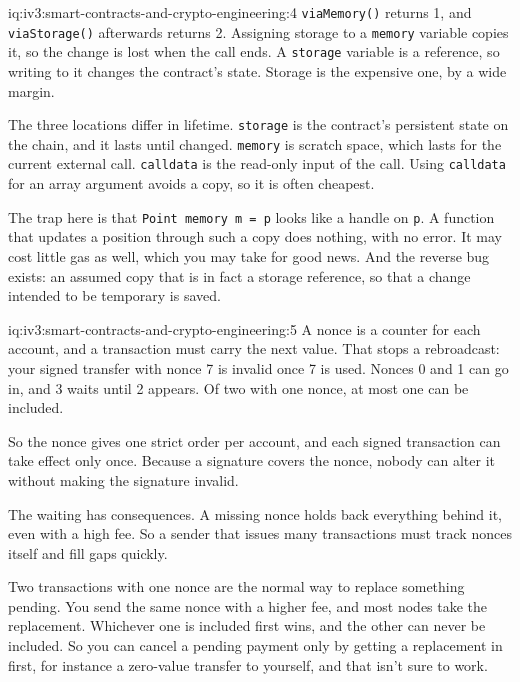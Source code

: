 \begin{solution}{iq:iv3:smart-contracts-and-crypto-engineering:4}
\texttt{viaMemory()} returns 1, and \texttt{viaStorage()} afterwards returns 2. Assigning storage to a \texttt{memory} variable copies it, so the change is lost when the call ends. A \texttt{storage} variable is a reference, so writing to it changes the contract's state. Storage is the expensive one, by a wide margin.

The three locations differ in lifetime. \texttt{storage} is the contract's persistent state on the chain, and it lasts until changed. \texttt{memory} is scratch space, which lasts for the current external call. \texttt{calldata} is the read-only input of the call. Using \texttt{calldata} for an array argument avoids a copy, so it is often cheapest.

The trap here is that \texttt{Point memory m = p} looks like a handle on \texttt{p}. A function that updates a position through such a copy does nothing, with no error. It may cost little gas as well, which you may take for good news. And the reverse bug exists: an assumed copy that is in fact a storage reference, so that a change intended to be temporary is saved.

\end{solution}

\begin{solution}{iq:iv3:smart-contracts-and-crypto-engineering:5}
A nonce is a counter for each account, and a transaction must carry the next value. That stops a rebroadcast: your signed transfer with nonce 7 is invalid once 7 is used. Nonces 0 and 1 can go in, and 3 waits until 2 appears. Of two with one nonce, at most one can be included.

So the nonce gives one strict order per account, and each signed transaction can take effect only once. Because a signature covers the nonce, nobody can alter it without making the signature invalid.

The waiting has consequences. A missing nonce holds back everything behind it, even with a high fee. So a sender that issues many transactions must track nonces itself and fill gaps quickly.

Two transactions with one nonce are the normal way to replace something pending. You send the same nonce with a higher fee, and most nodes take the replacement. Whichever one is included first wins, and the other can never be included. So you can cancel a pending payment only by getting a replacement in first, for instance a zero-value transfer to yourself, and that isn't sure to work.

\end{solution}

